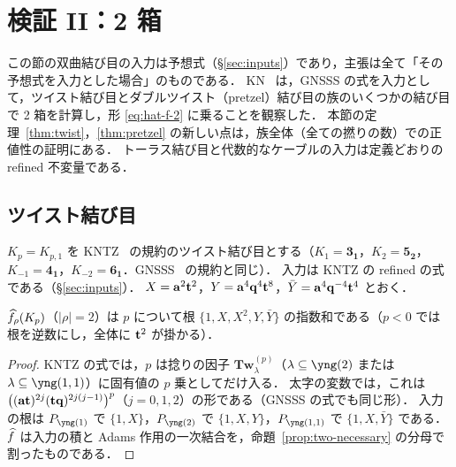 \section{検証 II：2 箱}\label{sec:two}

この節の双曲結び目の入力は予想式（\S\ref{sec:inputs}）であり，主張は全て「その予想式を入力とした場合」のものである．
KN~\cite{Kameyama17} は，GNSSS の式を入力として，ツイスト結び目とダブルツイスト（pretzel）結び目の族のいくつかの結び目で 2 箱を計算し，形 \eqref{eq:hat-f-2} に乗ることを観察した．
本節の定理~\ref{thm:twist}，\ref{thm:pretzel} の新しい点は，族全体（全ての撚りの数）での正値性の証明にある．
トーラス結び目と代数的なケーブルの入力は定義どおりの refined 不変量である．

\subsection{ツイスト結び目}
$K_p=K_{p,1}$ を KNTZ~\cite{Kameyama19} の規約のツイスト結び目とする（$K_1=\mathbf{3_1}$，$K_2=\mathbf{5_2}$，$K_{-1}=\mathbf{4_1}$，$K_{-2}=\mathbf{6_1}$．GNSSS~\cite{Gukov15} の規約と同じ）．
入力は KNTZ の refined の式である（\S\ref{sec:inputs}）．
$X=\mathbf{a}^2\mathbf{t}^2$，$Y=\mathbf{a}^4\mathbf{q}^4\mathbf{t}^8$，$\bar Y=\mathbf{a}^4\mathbf{q}^{-4}\mathbf{t}^4$ とおく．

\begin{lemma}\label{lem:twist-expsum}
$\widehat{f}_\rho(K_p)$（$|\rho|=2$）は $p$ について根 $\{1,X,X^2,Y,\bar Y\}$ の指数和である（$p<0$ では根を逆数にし，全体に $\mathbf{t}^2$ が掛かる）．
\end{lemma}
\begin{proof}
KNTZ の式では，$p$ は捻りの因子 $\mathbf{Tw}^{(p)}_\lambda$（$\lambda\subseteq\yng(2)$ または $\lambda\subseteq\yng(1,1)$）に固有値の $p$ 乗としてだけ入る．
太字の変数では，これは $\bigl((\mathbf{a}\mathbf{t})^{2j}(\mathbf{t}\mathbf{q})^{2j(j-1)}\bigr)^p$（$j=0,1,2$）の形である（GNSSS の式でも同じ形）．
入力の根は $P_{\yng(1)}$ で $\{1,X\}$，$P_{\yng(2)}$ で $\{1,X,Y\}$，$P_{\yng(1,1)}$ で $\{1,X,\bar Y\}$ である．
$\widehat{f}$ は入力の積と Adams 作用の一次結合を，命題~\ref{prop:two-necessary} の分母で割ったものである．
\end{proof}

